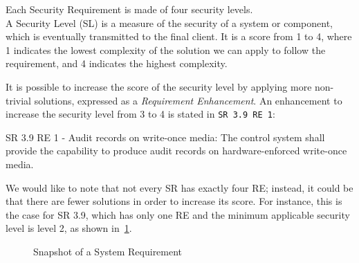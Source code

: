 Each Security Requirement is made of four security levels. \\
A Security Level (SL) is a measure of the security of a system or component, which is eventually transmitted to the final client. It is a score from 1 to 4, where 1 indicates the lowest complexity of the solution we can apply to follow the requirement, and 4 indicates the highest complexity.~\cite{iec-62443-ixon-practical-guide}

It is possible to increase the score of the security level by applying more non-trivial solutions, expressed as a \textit{Requirement Enhancement}. An enhancement to increase the security level from 3 to 4 is stated in \texttt{SR 3.9 RE 1}:
\begin{mdframed}
  SR 3.9 RE 1 - Audit records on write-once media: The control system shall provide the capability to produce audit records on hardware-enforced write-once media.
\end{mdframed}\label{sr:3-3_3-9_re1}

We would like to note that not every SR has exactly four RE; instead, it could be that there are fewer solutions in order to increase its score. For instance, this is the case for SR 3.9, which has only one RE and the minimum applicable security level is level 2, as shown in~\cref{fig:iec62443_3-3_3_9}.

\begin{figure}[ht]
  \centering
  \caption[Snapshot of a System Requirement]{Snapshot of a System Requirement}
  \label{fig:iec62443_3-3_3_9}
\end{figure}

